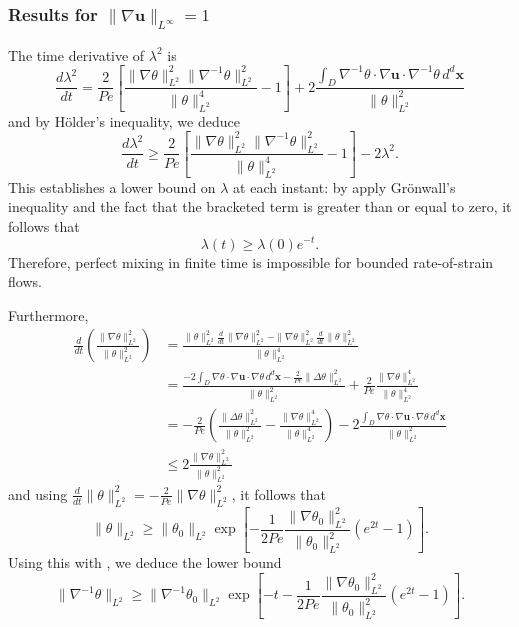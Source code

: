 \documentclass[12pt]{iopart}
\newcommand{\ddt}[1]{\frac{d #1}{dt}}
\newcommand{\hmone}[1]{\|\nabla^{-1} #1\|_{L^{2}}}
\newcommand{\ltwo}[1]{\|#1\|_{L^{2}}}
\newcommand{\hone}[1]{\| \nabla #1\|_{L^{2}}}
\newcommand{\sint}[1]{\int_{D} #1 \, d^{d}\mathbf{x}}
\renewcommand{\vec}[1]{\mathbf{#1}}
\newcommand{\linf}[1]{\| #1 \|_{L^{\infty}}}
\begin{document}
\label{sec:linfty_flows}
\subsubsection{Results for $\linf{\nabla \vec{u}} = 1$}

The time derivative of $\lambda^2$ is
%
\begin{equation*}
	\ddt{\lambda^2} = \frac{2}{Pe}
		\left[ 
			\frac{\hone{\theta}^2\hmone{\theta}^2}
					{\ltwo{\theta}^4}  
			- 1
		\right]
		+ 2 \frac{\sint{\nabla^{-1}\theta \cdot \nabla\vec{u} \cdot 
							\nabla^{-1}\theta  }}
					  {\ltwo{\theta}^{2}}
\end{equation*}
and by H\"older's inequality, we deduce
\begin{equation*}
\label{eq:length_ineq_rate-of-strain}
	\ddt{\lambda^2} \geq \frac{2}{Pe} \left[ 
			\frac{\hone{\theta}^2\hmone{\theta}^2}
					{\ltwo{\theta}^4}  
			- 1
		\right] - 2  \lambda^2 .
\end{equation*}
This establishes a lower bound on $\lambda$ at each instant: by apply Gr\"onwall's inequality and the fact that the bracketed term is greater than or equal to zero, it follows that
%
\begin{equation}
\label{eq:exponential_enstrophy}
	\lambda (t) \geq \lambda(0)e^{- t}.
\end{equation}
%
Therefore, perfect mixing in finite time is impossible for bounded rate-of-strain flows.

Furthermore,
%
 \begin{eqnarray*}
\frac{d}{dt}\left(\frac{\|\nabla\theta\|_{L^{2}}^2}{\|\theta\|_{L^{2}}^2}\right) &= \frac{\|\theta\|_{L^{2}}^2\frac{d}{dt}\|\nabla\theta\|_{L^{2}}^2-\|\nabla\theta\|_{L^{2}}^2\frac{d}{dt}\|\theta\|_{L^{2}}^2}{\|\theta\|_{L^{2}}^4}\\
&= \frac{-2\sint{\nabla\theta \cdot \nabla\vec{u} \cdot \nabla\theta  } - \frac{2}{Pe} \|\Delta\theta\|_{L^{2}}^2}{\|\theta\|_{L^{2}}^2}+\frac{2}{Pe}\frac{\|\nabla\theta\|_{L^{2}}^4}{\|\theta\|_{L^{2}}^4} \\
&=-\frac{2}{Pe}\left(\frac{\|\Delta\theta\|_{L^{2}}^2}{\|\theta\|_{L^{2}}^2} - \frac{\|\nabla\theta\|_{L^{2}}^4}{\|\theta\|_{L^{2}}^4} \right) - 2\frac{\sint{\nabla\theta \cdot \nabla\vec{u} \cdot \nabla\theta  }}{\|\theta\|_{L^{2}}^2} 
\\
&\leq 2 \frac{\hone{\theta}^2}{\ltwo{\theta}^2}
\end{eqnarray*}
and using $\ddt{}\ltwo{\theta}^2 = -\frac{2}{Pe} \hone{\theta}^2$, it follows that
\begin{equation}
\ltwo{\theta}\geq  \ltwo{\theta_{0}}\exp\left[-\frac{1}{2Pe}\frac{\hone{\theta_{0}}^2}{\ltwo{\theta_{0}}^2}\left(e^{2 t} -1\right)\right].
\end{equation}
Using this with , we deduce the lower bound
\begin{equation}
\hmone{\theta} \geq  \hmone{\theta_{0}} \exp\left[- t -\frac{1}{2 Pe}\frac{\hone{\theta_{0}}^2}{\ltwo{\theta_{0}}^2}\left(e^{2 t} -1\right)\right].
\end{equation}
\end{document}
